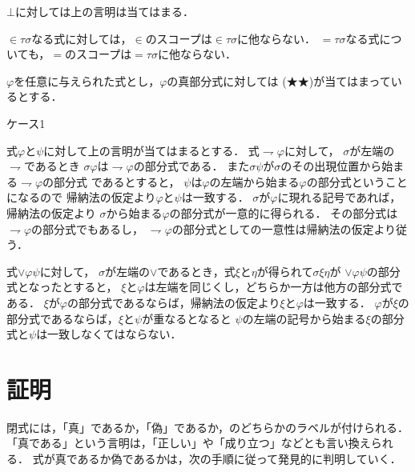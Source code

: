 \documentclass[a4j,10.5pt,oneside,openany]{jsbook}
\begin{document}
	$\bot$に対しては上の言明は当てはまる．
	
	$\in \tau \sigma$なる式に対しては，$\in$のスコープは$\in \tau \sigma$に他ならない．
	$= \tau \sigma$なる式についても，$=$のスコープは$= \tau \sigma$に他ならない．
	
	$\varphi$を任意に与えられた式とし，$\varphi$の真部分式に対しては
	(★★)が当てはまっているとする．
	
	\begin{description}
		\item[ケース1] 
	\end{description}
	式$\varphi$と$\psi$に対して上の言明が当てはまるとする．
	式$\rightharpoondown \varphi$に対して，
	$\sigma$が左端の$\rightharpoondown$であるとき
	$\sigma \varphi$は$\rightharpoondown \varphi$の部分式である．
	また$\sigma \psi$が$\sigma$のその出現位置から始まる$\rightharpoondown \varphi$の部分式
	であるとすると，
	$\psi$は$\varphi$の左端から始まる$\varphi$の部分式ということになるので
	帰納法の仮定より$\varphi$と$\psi$は一致する．
	$\sigma$が$\varphi$に現れる記号であれば，帰納法の仮定より
	$\sigma$から始まる$\varphi$の部分式が一意的に得られる．
	その部分式は$\rightharpoondown \varphi$の部分式でもあるし，
	$\rightharpoondown \varphi$の部分式としての一意性は帰納法の仮定より従う．
	
	式$\vee \varphi \psi$に対して，
	$\sigma$が左端の$\vee$であるとき，式$\xi$と$\eta$が得られて$\sigma \xi \eta$が
	$\vee \varphi \psi$の部分式となったとすると，
	$\xi$と$\varphi$は左端を同じくし，どちらか一方は他方の部分式である．
	$\xi$が$\varphi$の部分式であるならば，帰納法の仮定より$\xi$と$\varphi$は一致する．
	$\varphi$が$\xi$の部分式であるならば，$\xi$と$\psi$が重なるとなると
	$\psi$の左端の記号から始まる$\xi$の部分式と$\psi$は一致しなくてはならない．
	
\section{証明}
	閉式には，「真」であるか，「偽」であるか，のどちらかのラベルが付けられる．
	「真である」という言明は，「正しい」や「成り立つ」などとも言い換えられる．
	式が真であるか偽であるかは，次の手順に従って発見的に判明していく．
	
\end{document}
